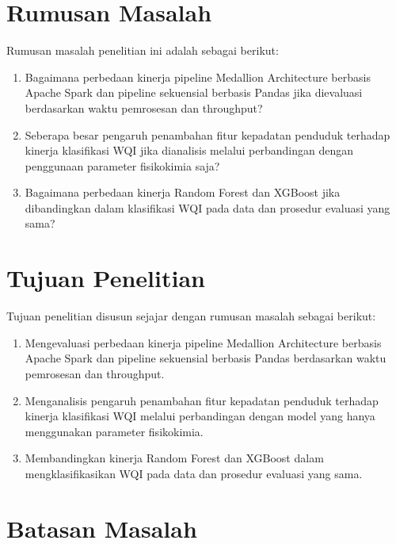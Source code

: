 \section{Rumusan Masalah}

Rumusan masalah penelitian ini adalah sebagai berikut:
\begin{enumerate}
    \item Bagaimana perbedaan kinerja pipeline Medallion Architecture berbasis Apache Spark dan pipeline sekuensial berbasis Pandas jika dievaluasi berdasarkan waktu pemrosesan dan throughput?
    \item Seberapa besar pengaruh penambahan fitur kepadatan penduduk terhadap kinerja klasifikasi WQI jika dianalisis melalui perbandingan dengan penggunaan parameter fisikokimia saja?
    \item Bagaimana perbedaan kinerja Random Forest dan XGBoost jika dibandingkan dalam klasifikasi WQI pada data dan prosedur evaluasi yang sama?
\end{enumerate}

\section{Tujuan Penelitian}

Tujuan penelitian disusun sejajar dengan rumusan masalah sebagai berikut:
\begin{enumerate}
    \item Mengevaluasi perbedaan kinerja pipeline Medallion Architecture berbasis Apache Spark dan pipeline sekuensial berbasis Pandas berdasarkan waktu pemrosesan dan throughput.
    \item Menganalisis pengaruh penambahan fitur kepadatan penduduk terhadap kinerja klasifikasi WQI melalui perbandingan dengan model yang hanya menggunakan parameter fisikokimia.
    \item Membandingkan kinerja Random Forest dan XGBoost dalam mengklasifikasikan WQI pada data dan prosedur evaluasi yang sama.
\end{enumerate}

\section{Batasan Masalah}

